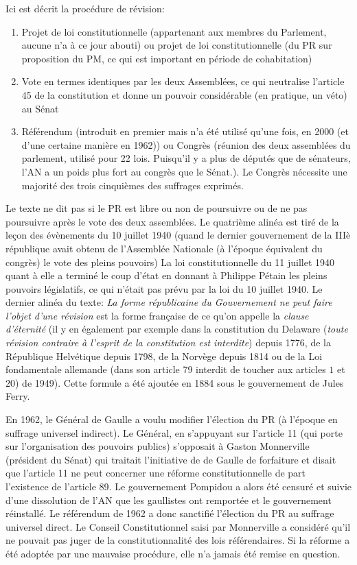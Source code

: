 \documentclass[math]{cours}
\begin{document}
Ici est décrit la procédure de révision:
\begin{enumerate}
	\item Projet de loi constitutionnelle (appartenant aux membres du Parlement, aucune n'a à ce jour abouti) ou projet de loi constitutionnelle (du PR sur proposition du PM, ce qui est important en période de cohabitation)
	\item Vote en termes identiques par les deux Assemblées, ce qui neutralise l'article 45 de la constitution et donne un pouvoir considérable (en pratique, un véto) au Sénat
	\item Référendum (introduit en premier mais n'a été utilisé qu'une fois, en 2000 (et d'une certaine manière en 1962)) ou Congrès (réunion des deux assemblées du parlement, utilisé pour 22 lois. Puisqu'il y a plus de députés que de sénateurs, l'AN a un poids plus fort au congrès que le Sénat.).
	      Le Congrès nécessite une majorité des trois cinquièmes des suffrages exprimés.
\end{enumerate}
Le texte ne dit pas si le PR est libre ou non de poursuivre ou de ne pas poursuivre après le vote des deux assemblées.
Le quatrième alinéa est tiré de la leçon des évènements du 10 juillet 1940 (quand le dernier gouvernement de la IIIè république avait obtenu de l'Assemblée Nationale (à l'époque équivalent du congrès) le vote des pleins pouvoirs)
La loi constitutionnelle du 11 juillet 1940 quant à elle a terminé le coup d'état en donnant à Philippe Pétain les pleins pouvoirs législatifs, ce qui n'était pas prévu par la loi du 10 juillet 1940.
Le dernier alinéa du texte: \emph{La forme républicaine du Gouvernement ne peut faire l'objet d'une révision} est la forme française de ce qu'on appelle la \emph{clause d'éternité} (il y en également par exemple dans la constitution du Delaware (\emph{toute révision contraire à l'esprit de la constitution est interdite}) depuis 1776, de la République Helvétique depuis 1798, de la Norvège depuis 1814 ou de la Loi fondamentale allemande (dans son article 79 interdit de toucher aux articles $1$ et $20$) de 1949).
Cette formule a été ajoutée en 1884 sous le gouvernement de Jules Ferry.

En 1962, le Général de Gaulle a voulu modifier l'élection du PR (à l'époque en suffrage universel indirect).
Le Général, en s'appuyant sur l'article 11 (qui porte sur l'organisation des pouvoirs publics) s'opposait à
Gaston Monnerville (président du Sénat) qui traitait l'initiative de de Gaulle de forfaiture
et disait que l'article 11 ne peut concerner une réforme constitutionnelle de part l'existence de l'article 89.
Le gouvernement Pompidou a alors été censuré et suivie d'une dissolution de l'AN que les gaullistes ont remportée et le gouvernement réinstallé.
Le référendum de 1962 a donc sanctifié l'élection du PR au suffrage universel direct.
Le Conseil Constitutionnel saisi par Monnerville a considéré qu'il ne pouvait pas juger de la constitutionnalité des lois référendaires.
Si la réforme a été adoptée par une mauvaise procédure, elle n'a jamais été remise en question.
\end{document}
